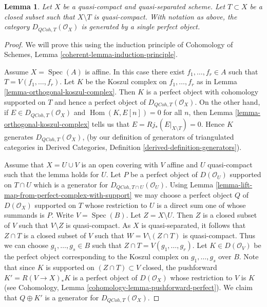 \documentclass{stacks-project}
\newenvironment{reference}{\comment}{\endcomment}
\theoremstyle{plain}
\newtheorem{lemma}[subsection]{Lemma}
\theoremstyle{definition}
\theoremstyle{remark}
\numberwithin{equation}{subsection}
\def\Spec{\mathop{\mathrm{Spec}}}
\def\Hom{\mathop{\mathrm{Hom}}\nolimits}
\def\QCoh{\mathit{QCoh}}
\begin{document}
\begin{lemma}
\label{lemma-generator-with-support}
\begin{reference}
\cite[Theorem 6.8]{Rouquier-dimensions}
\end{reference}
Let $X$ be a quasi-compact and quasi-separated scheme. Let $T \subset X$ be a
closed subset such that $X \setminus T$ is quasi-compact. With notation
as above, the category $D_{\QCoh, T}(\mathcal{O}_X)$ is generated by a
single perfect object.
\end{lemma}

\begin{proof}
We will prove this using the induction principle of
Cohomology of Schemes, Lemma \ref{coherent-lemma-induction-principle}.

\medskip\noindent
Assume $X = \Spec(A)$ is affine. In this case there exist
$f_1, \ldots, f_r \in A$ such that $T = V(f_1, \ldots, f_r)$.
Let $K$ be the Koszul complex on $f_1, \ldots, f_r$ as in
Lemma \ref{lemma-orthogonal-koszul-complex}.
Then $K$ is a perfect object with cohomology supported on
$T$ and hence a perfect object of $D_{\QCoh, T}(\mathcal{O}_X)$.
On the other hand, if $E \in D_{\QCoh, T}(\mathcal{O}_X)$ and
$\Hom(K, E[n]) = 0$ for all $n$, then
Lemma \ref{lemma-orthogonal-koszul-complex}
tells us that $E = Rj_*(E|_{X \setminus T}) = 0$.
Hence $K$ generates $D_{\QCoh, T}(\mathcal{O}_X)$,
(by our definition of generators of triangulated categories in
Derived Categories, Definition \ref{derived-definition-generators}).

\medskip\noindent
Assume that $X = U \cup V$ is an open covering with $V$ affine and
$U$ quasi-compact such that the lemma holds for $U$.
Let $P$ be a perfect object of $D(\mathcal{O}_U)$ supported on $T \cap U$
which is a generator for $D_{\QCoh, T \cap U}(\mathcal{O}_U)$. Using
Lemma \ref{lemma-lift-map-from-perfect-complex-with-support}
we may choose a perfect object $Q$ of $D(\mathcal{O}_X)$ supported on $T$
whose restriction to $U$ is a direct sum one of whose summands is $P$.
Write $V = \Spec(B)$. Let $Z = X \setminus U$. Then $Z$ is a closed subset
of $V$ such that $V \setminus Z$ is quasi-compact. As $X$ is quasi-separated,
it follows that $Z \cap T$ is a closed subset of $V$ such that
$W = V \setminus (Z \cap T)$ is quasi-compact. Thus we can choose
$g_1, \ldots, g_s \in B$ such that $Z \cap T = V(g_1, \ldots, g_r)$.
Let $K \in D(\mathcal{O}_V)$ be the perfect object corresponding to the
Koszul complex on $g_1, \ldots, g_s$ over $B$. Note that since $K$ is
supported on $(Z \cap T) \subset V$ closed, the pushforward
$K' = R(V \to X)_*K$ is a perfect object of $D(\mathcal{O}_X)$ whose
restriction to $V$ is $K$ (see
Cohomology, Lemma \ref{cohomology-lemma-pushforward-perfect}).
We claim that $Q \oplus K'$ is a generator for
$D_{\QCoh, T}(\mathcal{O}_X)$.


\end{proof}
\end{document}

